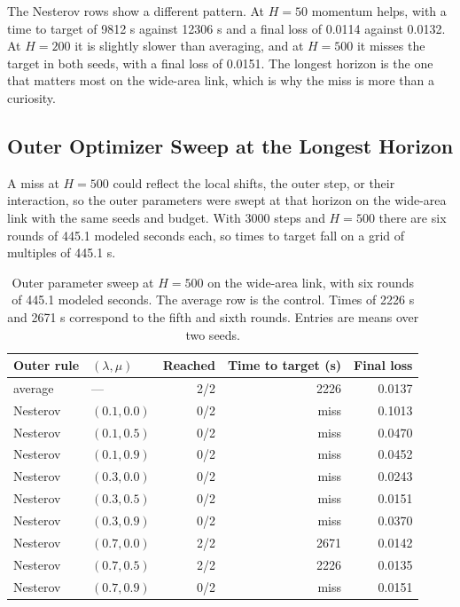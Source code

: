 \documentclass[11pt]{article}
\theoremstyle{definition}
\theoremstyle{remark}
\begin{document}
The Nesterov rows show a different pattern. At $H=50$ momentum helps, with a time to target of 9812 s against 12306 s and a final loss of 0.0114 against 0.0132. At $H=200$ it is slightly slower than averaging, and at $H=500$ it misses the target in both seeds, with a final loss of 0.0151. The longest horizon is the one that matters most on the wide-area link, which is why the miss is more than a curiosity.

\subsection{Outer Optimizer Sweep at the Longest Horizon}

A miss at $H=500$ could reflect the local shifts, the outer step, or their interaction, so the outer parameters were swept at that horizon on the wide-area link with the same seeds and budget. With 3000 steps and $H=500$ there are six rounds of 445.1 modeled seconds each, so times to target fall on a grid of multiples of 445.1 s.

\begin{table}[h]
\centering
\small
\begin{tabular}{llrrr}
\toprule
Outer rule & $(\lambda,\mu)$ & Reached & Time to target (s) & Final loss\\
\midrule
average  & ---        & 2/2 & 2226 & 0.0137\\
\midrule
Nesterov & $(0.1,0.0)$ & 0/2 & miss & 0.1013\\
Nesterov & $(0.1,0.5)$ & 0/2 & miss & 0.0470\\
Nesterov & $(0.1,0.9)$ & 0/2 & miss & 0.0452\\
Nesterov & $(0.3,0.0)$ & 0/2 & miss & 0.0243\\
Nesterov & $(0.3,0.5)$ & 0/2 & miss & 0.0151\\
Nesterov & $(0.3,0.9)$ & 0/2 & miss & 0.0370\\
Nesterov & $(0.7,0.0)$ & 2/2 & 2671 & 0.0142\\
Nesterov & $(0.7,0.5)$ & 2/2 & 2226 & 0.0135\\
Nesterov & $(0.7,0.9)$ & 0/2 & miss & 0.0151\\
\bottomrule
\end{tabular}
\caption{Outer parameter sweep at $H=500$ on the wide-area link, with six rounds of 445.1 modeled seconds. The average row is the control. Times of 2226 s and 2671 s correspond to the fifth and sixth rounds. Entries are means over two seeds.}
\label{tab:sweep}
\end{table}
\end{document}
